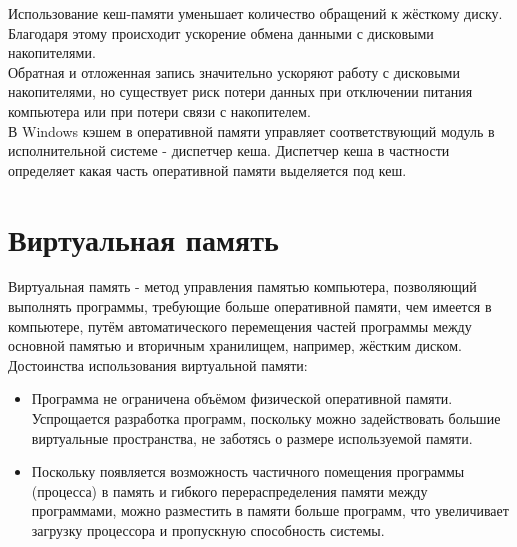 \documentclass[a4paper]{article}
\begin{document}
Использование кеш-памяти уменьшает количество обращений к жёсткому диску. Благодаря этому происходит ускорение обмена данными с дисковыми накопителями.\\
Обратная и отложенная запись значительно ускоряют работу с дисковыми накопителями, но существует риск потери данных при отключении питания компьютера или при потери связи с накопителем.\\
В Windows кэшем в оперативной памяти управляет соответствующий модуль в исполнительной системе - диспетчер кеша. Диспетчер кеша в частности определяет какая часть оперативной памяти выделяется под кеш.\\
\section{Виртуальная память}
\setcounter{subsection}{0}
Виртуальная память - метод управления памятью компьютера, позволяющий выполнять программы, требующие больше оперативной памяти, чем имеется в компьютере, путём автоматического перемещения частей программы между основной памятью и вторичным хранилищем, например, жёстким диском.\\
Достоинства использования виртуальной памяти:\\
\begin{itemize}
        \item Программа не ограничена объёмом физической оперативной памяти. Успрощается разработка программ, поскольку можно задействовать большие виртуальные пространства, не заботясь о размере используемой памяти.\\
        \item Поскольку появляется возможность частичного помещения программы (процесса) в память и гибкого перераспределения памяти между программами, можно разместить в памяти больше программ, что увеличивает загрузку процессора и пропускную способность системы.	
\end{itemize}
\end{document}
